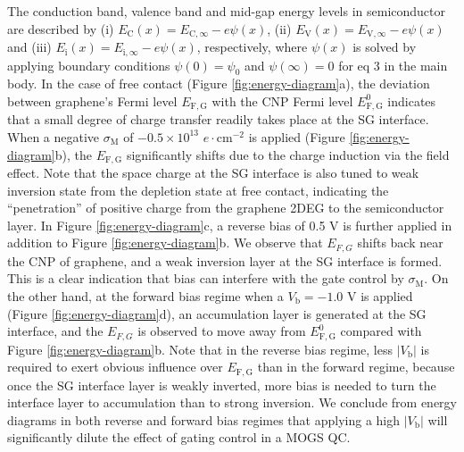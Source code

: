 \documentclass[manuscript=suppinfo]{achemso}
\newcommand*\subs[1]{_{\text{#1}}} %
\begin{document}
The conduction band, valence band and mid-gap energy levels in semiconductor are described by (i) $E\subs{C}(x)=E_{\mathrm{C,\infty}}-e\psi(x)$,  (ii) $E\subs{V}(x)=E_{\mathrm{V,\infty}}-e\psi(x)$ and (iii) $E\subs{i}(x)=E_{\mathrm{i,\infty}}-e\psi(x)$, respectively, where $\psi(x)$ is solved by applying boundary conditions $\psi(0)=\psi_0$ and $\psi(\infty)=0$  for eq 3 in the main body.
In the case of free contact (Figure \ref{fig:energy-diagram}a), the deviation between graphene's Fermi level $E_{\mathrm{F,G}}$ with the CNP Fermi level $E_{\mathrm{F,G}}^0$ indicates that a small degree of charge transfer readily takes place at the SG interface. 
When a negative $\sigma\subs{M}$ of $-0.5\times10^{13}$ $e\cdot$cm$^{-2}$ is applied (Figure \ref{fig:energy-diagram}b), the $E_{\mathrm{F,G}}$ significantly shifts due to the charge induction via the field effect.
Note that the space charge at the SG interface is also tuned to weak inversion state from the depletion state at free contact, indicating the ``penetration'' of positive charge from the graphene 2DEG to the semiconductor layer. 
In Figure \ref{fig:energy-diagram}c, a reverse bias of 0.5 V is further applied in addition to Figure \ref{fig:energy-diagram}b. 
We observe that $E_{F,G}$ shifts back near the CNP of graphene, and a weak inversion layer at the SG interface is formed.
This is a clear indication that bias can interfere with the gate control by $\sigma\subs{M}$.
On the other hand, at the forward bias regime when a $V\subs{b}=-1.0$ V is applied (Figure \ref{fig:energy-diagram}d), an accumulation layer is generated at the SG interface, and the $E_{F,G}$ is observed to move away from $E_{\mathrm{F,G}}^0$ compared with Figure \ref{fig:energy-diagram}b.
Note that in the reverse bias regime, less $|V\subs{b}|$ is required to exert obvious influence over $E_{\mathrm{F,G}}$ than in the forward regime, because once the SG interface layer is weakly inverted, more bias is needed to turn the interface layer to accumulation than to strong inversion.
We conclude from energy diagrams in both reverse and forward bias regimes that applying a high $|V\subs{b}|$ will significantly dilute the effect of gating control in a MOGS QC.

\newpage

\end{document}
